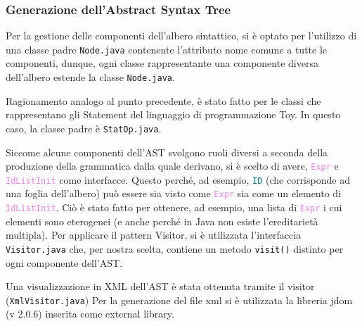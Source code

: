\documentclass[a4paper,12pt]{article}
\newcommand\nonterm[1]{\texttt{\textcolor{violet}{#1}}}
\newcommand\term[1]{\texttt{\textcolor{teal}{#1}}}
\begin{document}
	\subsubsection{Generazione dell'Abstract Syntax Tree}

 	Per la gestione delle componenti dell'albero sintattico, si è optato per l'utilizzo di una classe padre
	\texttt{Node.java} contenente l'attributo nome comune a tutte le componenti, dunque,
    ogni classe rappresentante una componente diversa dell'albero estende la classe \texttt{Node.java}.

	Ragionamento analogo al punto precedente, è stato fatto per le classi che rappresentano gli Statement del
    linguaggio di programmazione Toy. In questo caso, la classe padre è \texttt{StatOp.java}.

   Siccome alcune componenti dell'AST svolgono ruoli diversi a seconda della produzione della grammatica
   dalla quale derivano, si è scelto di avere, \nonterm{Expr} e \nonterm{IdListInit} come interfacce.
   Questo perché, ad esempio, \term{ID} (che corrisponde ad una foglia dell'albero) può essere sia visto come 
   \nonterm{Expr} sia come un elemento di \nonterm{IdListInit}.
   Ciò è stato fatto per ottenere, ad esempio, una lista di \nonterm{Expr} i cui elementi sono eterogenei (e anche perché in
   Java non esiste l'ereditarietà multipla).
   Per applicare il pattern Visitor, si è utilizzata l'interfaccia \texttt{Visitor.java} che, per nostra scelta,
   contiene un metodo \texttt{visit()} distinto per ogni componente dell'AST.

   Una visualizzazione in XML dell'AST è stata ottenuta tramite il visitor (\texttt{XmlVisitor.java}) 
   Per la generazione del file xml si è utilizzata la libreria jdom (v 2.0.6) inserita come external library.
\end{document}
